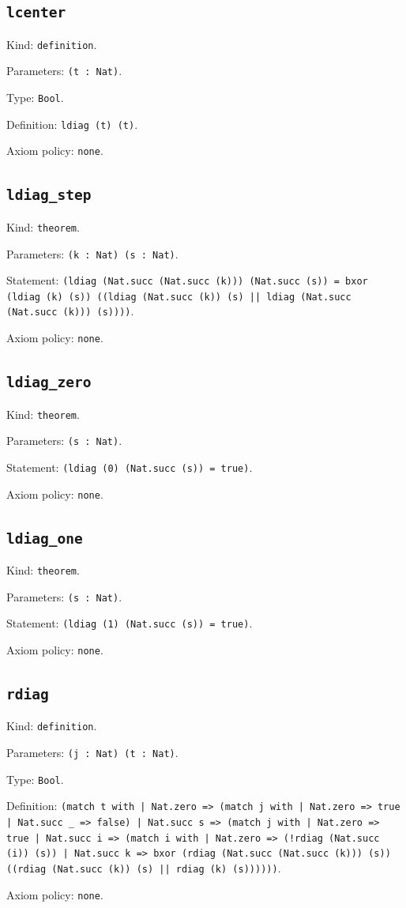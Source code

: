 \documentclass[11pt]{article}
\begin{document}
\subsection*{\texttt{lcenter}}
\noindent Kind: \texttt{definition}.\par
\noindent Parameters: \texttt{(t : Nat)}.\par
\noindent Type: \texttt{Bool}.\par
\noindent Definition: \texttt{ldiag (t) (t)}.\par
\noindent Axiom policy: \texttt{none}.\par
\subsection*{\texttt{ldiag\_step}}
\noindent Kind: \texttt{theorem}.\par
\noindent Parameters: \texttt{(k : Nat) (s : Nat)}.\par
\noindent Statement: \texttt{(ldiag (Nat.succ (Nat.succ (k))) (Nat.succ (s)) = bxor (ldiag (k) (s)) ((ldiag (Nat.succ (k)) (s) || ldiag (Nat.succ (Nat.succ (k))) (s))))}.\par
\noindent Axiom policy: \texttt{none}.\par
\subsection*{\texttt{ldiag\_zero}}
\noindent Kind: \texttt{theorem}.\par
\noindent Parameters: \texttt{(s : Nat)}.\par
\noindent Statement: \texttt{(ldiag (0) (Nat.succ (s)) = true)}.\par
\noindent Axiom policy: \texttt{none}.\par
\subsection*{\texttt{ldiag\_one}}
\noindent Kind: \texttt{theorem}.\par
\noindent Parameters: \texttt{(s : Nat)}.\par
\noindent Statement: \texttt{(ldiag (1) (Nat.succ (s)) = true)}.\par
\noindent Axiom policy: \texttt{none}.\par
\subsection*{\texttt{rdiag}}
\noindent Kind: \texttt{definition}.\par
\noindent Parameters: \texttt{(j : Nat) (t : Nat)}.\par
\noindent Type: \texttt{Bool}.\par
\noindent Definition: \texttt{(match t with | Nat.zero => (match j with | Nat.zero => true | Nat.succ \_ => false) | Nat.succ s => (match j with | Nat.zero => true | Nat.succ i => (match i with | Nat.zero => (!rdiag (Nat.succ (i)) (s)) | Nat.succ k => bxor (rdiag (Nat.succ (Nat.succ (k))) (s)) ((rdiag (Nat.succ (k)) (s) || rdiag (k) (s))))))}.\par
\noindent Axiom policy: \texttt{none}.\par
\end{document}
